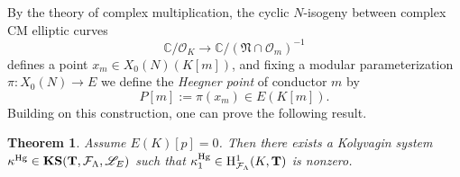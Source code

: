 \documentclass[10pt]{amsart}
\numberwithin{equation}{section}
\newtheorem{theorem}{Theorem}
\theoremstyle{definition}
\theoremstyle{remark}
\newcommand{\cL}{\mathscr{L}}
\newcommand{\Fcal}{\mathcal{F}}
\newcommand{\rH}{\mathrm{H}}
\begin{document}
By the theory of complex multiplication, the cyclic $N$-isogeny between complex CM elliptic curves
\[
\mathbb{C}/\mathcal{O}_K\rightarrow\mathbb{C}/(\mathfrak{N}\cap\mathcal{O}_m)^{-1}
\]
defines a point $x_m\in X_0(N)(K[m])$, and fixing a modular parameterization $\pi:X_0(N)\rightarrow E$ we define the \emph{Heegner point} of conductor $m$ by   
\[
P[m]:=\pi(x_m)\in E(K[m]).
\]
Building on this construction, one can prove the following result.


\begin{theorem}%
\label{thm:howard-HPKS}
Assume $E(K)[p]=0$. Then there exists a Kolyvagin system $\kappa^{\rm Hg}\in\mathbf{KS}(\mathbf{T},\mathcal{F}_\Lambda,\cL_E)$ such that $\kappa_1^{\rm Hg}\in\rH^1_{\Fcal_\Lambda}(K,\mathbf{T})$ is nonzero.
\end{theorem}
\end{document}
